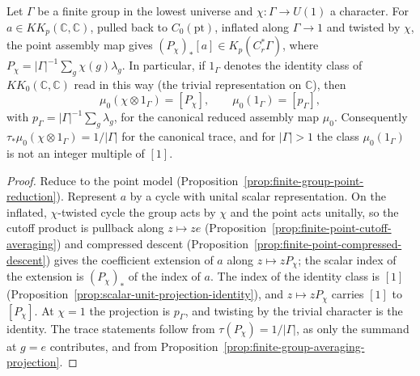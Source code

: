 \begin{proposition}\label{prop:finite-group-character-assembly}
\leanok
Let $\Gamma$ be a finite group in the lowest universe and $\chi\colon\Gamma\to U(1)$
a character. For $a\in KK_p(\mathbb C,\mathbb C)$, pulled back to
$C_0(\mathrm{pt})$, inflated along $\Gamma\to1$ and twisted by $\chi$, the point
assembly map gives $(P_\chi)_*[a]\in K_p(C^*_r\Gamma)$, where
$P_\chi=|\Gamma|^{-1}\sum_g\chi(g)\lambda_g$. In particular, if $1_\Gamma$ denotes
the identity class of $KK_0(\mathbb C,\mathbb C)$ read in this way (the trivial
representation on $\mathbb C$), then
\[
  \mu_0(\chi\otimes1_\Gamma)=[P_\chi],\qquad \mu_0(1_\Gamma)=[p_\Gamma],
\]
with $p_\Gamma=|\Gamma|^{-1}\sum_g\lambda_g$, for the canonical reduced assembly map
$\mu_0$. Consequently $\tau_*\mu_0(\chi\otimes1_\Gamma)=1/|\Gamma|$ for the
canonical trace, and for $|\Gamma|>1$ the class $\mu_0(1_\Gamma)$ is not an
integer multiple of $[1]$.
\end{proposition}
\begin{proof}
\leanok
Reduce to the point model
(Proposition~\ref{prop:finite-group-point-reduction}). Represent $a$ by a cycle
with unital scalar representation. On the inflated, $\chi$-twisted cycle the group
acts by $\chi$ and the point acts unitally, so the cutoff product is pullback along
$z\mapsto ze$ (Proposition~\ref{prop:finite-point-cutoff-averaging}) and compressed
descent (Proposition~\ref{prop:finite-point-compressed-descent}) gives the coefficient
extension of $a$ along $z\mapsto zP_\chi$; the scalar index of the extension is
$(P_\chi)_*$ of the index of $a$. The index of the identity class is $[1]$
(Proposition~\ref{prop:scalar-unit-projection-identity}), and $z\mapsto zP_\chi$
carries $[1]$ to $[P_\chi]$. At $\chi=1$ the projection is $p_\Gamma$, and twisting
by the trivial character is the identity. The trace statements follow from
$\tau(P_\chi)=1/|\Gamma|$, as only the summand at $g=e$ contributes, and from
Proposition~\ref{prop:finite-group-averaging-projection}.
\end{proof}

